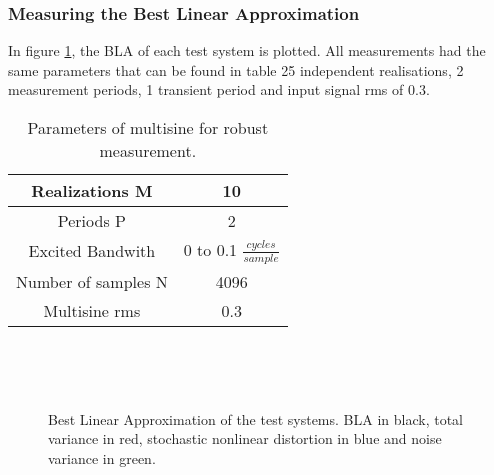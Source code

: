 	\subsubsection{Measuring the Best Linear Approximation}
	In figure \ref{fig:sim_BLA}, the BLA of each test system is plotted. All measurements had the same parameters that can be found in table 25 independent realisations, 2 measurement periods, 1 transient period and input signal rms of $0.3$.

	\begin{table}
	\renewcommand{\arraystretch}{1.3} \centering \caption{Parameters of multisine for robust measurement.} \label{robustparam} 
	\begin{tabular}
		{|c|c|} \hline Realizations M & 10\\
		\hline Periods P & 2\\
		\hline Excited Bandwith  & 0 to 0.1 $\frac{cycles}{sample}$  \\
		\hline Number of samples N & 4096\\
		\hline Multisine rms & 0.3 \\
		\hline 
	\end{tabular}
	\end{table}

	\begin{figure}
        \centering
        \begin{subfigure}[b]{0.3\textwidth}
            \centering
            \setlength\figureheight{3cm} 
			\setlength{}
			

        \end{subfigure}%
        ~ 
        \begin{subfigure}[b]{0.3\textwidth}
        	\centering
            \setlength\figureheight{3cm} 
			\setlength{}
			
        \end{subfigure}
        ~ 
        \begin{subfigure}[b]{0.3\textwidth}
        	\centering
            \setlength\figureheight{3cm} 
			\setlength{}
			
        \end{subfigure}
        \caption{Best Linear Approximation of the test systems. BLA in black, total variance in red, stochastic nonlinear distortion in blue and noise variance in green. }
        \label{fig:sim_BLA}
\end{figure}
	
